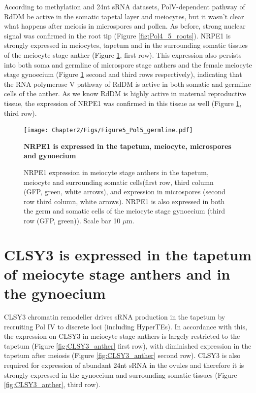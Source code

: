 According to methylation and 24nt sRNA datasets,  PolV-dependent pathway of RdDM be active in the somatic tapetal layer and meiocytes, but it wasn't clear what happens after meiosis in microspores and pollen. As before, strong nuclear signal was confirmed in the root tip (Figure \ref{fig:Pol4_5_roots}).  NRPE1 is strongly expressed in meiocytes, tapetum and in the surrounding somatic tissues of the meiocyte stage anther (Figure \ref{fig:Pol5_germ}, first row). This expression also persists into both soma and germline of microspore stage anthers and the female meiocyte stage gynoecium (Figure \ref{fig:Pol5_germ} second and third rows respectively), indicating that the RNA polymerase V pathway of RdDM is active in both somatic and germline cells of the anther. As we know RdDM is highly active in maternal reproductive tissue, the expression of NRPE1 was confirmed in this tissue as well (Figure \ref{fig:Pol5_germ}, third row).

\begin{figure}[htbp!] 
\centering    
    \texttt{[image: Chapter2/Figs/Figure5\_Pol5\_germline.pdf]}
\caption{\textbf{NRPE1 is expressed in the tapetum, meiocyte, microspores and gynoecium}}
\label{fig:Pol5_germ}
\captionsetup{font=small}
    \caption*{NRPE1 expression in meiocyte stage anthers in the tapetum, meiocyte and surrounding somatic cells(first row, third column (GFP, green, white arrows), and expression in microspores (second row third column, white arrows). NRPE1 is also expressed in both the germ and somatic cells of the meiocyte stage gynoecium (third row (GFP, green)). Scale bar 10 $\mu$m.}
\end{figure}


\section{CLSY3 is expressed in the tapetum of meiocyte stage anthers and in the gynoecium}

CLSY3 chromatin remodeller drives sRNA production in the tapetum \cite{RN187} by recruiting Pol IV to discrete loci (including HyperTEs)\cite{RN23}. In accordance with this, the expression on CLSY3 in meiocyte stage anthers is largely restricted to the tapetum (Figure \ref{fig:CLSY3_anther} first row), with diminished expression in the tapetum after meiosis (Figure \ref{fig:CLSY3_anther} second row). CLSY3 is also required for expression of abundant 24nt sRNA in the ovules and therefore it is strongly expressed in the gynoecium and surrounding somatic tissues (Figure \ref{fig:CLSY3_anther}, third row).

